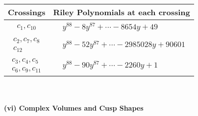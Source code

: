 \documentclass[1p]{elsarticle_modified}
\theoremstyle{definition}
\begin{document}
\begin{tabular}{m{50pt}|m{274pt}}
Crossings & \hspace{64pt}Riley Polynomials at each crossing \\
\hline $$\begin{aligned}c_{1},c_{10}\end{aligned}$$&$\begin{aligned}
&y^{88}-8 y^{87}+\cdots-8654 y+49
\end{aligned}$\\
\hline $$\begin{aligned}c_{2},c_{7},c_{8}\\c_{12}\end{aligned}$$&$\begin{aligned}
&y^{88}-52 y^{87}+\cdots-2985028 y+90601
\end{aligned}$\\
\hline $$\begin{aligned}c_{3},c_{4},c_{5}\\c_{6},c_{9},c_{11}\end{aligned}$$&$\begin{aligned}
&y^{88}-90 y^{87}+\cdots-2260 y+1
\end{aligned}$\\
\hline
\end{tabular}\\~\\
\newpage\flushleft \textbf{(vi) Complex Volumes and Cusp Shapes}
\end{document}
